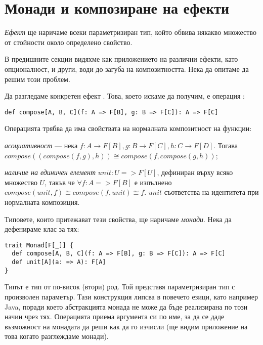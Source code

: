\section{Монади и композиране на ефекти}
\label{sec:monads}

\emph{Ефект} ще наричаме всеки параметризиран тип, който обвива някакво множество от стойности около определено свойство.

В предишните секции видяхме как приложението на различни ефекти, като опционалност,  и други, води до загуба на композитността. Нека да опитаме да решим този проблем.

Да разгледаме конкретен ефект . Това, което искаме да получим, е операция :

\begin{lstlisting}
def compose[A, B, C](f: A => F[B], g: B => F[C]): A => F[C]
\end{lstlisting}

Операцията трябва да има свойствата на нормалната композитност на функции:

\begin{itemize*}
  \item \emph{асоциативност} — нека $f: A \rightarrow F[B], g: B \rightarrow F[C], h: C \rightarrow F[D]$. Тогава $compose((compose(f, g), h)) \cong compose(f, compose(g, h))$;
  \item \emph{наличие на единичен елемент} $unit: U => F[U]$, дефиниран върху всяко множество $U$, такъв че $\forall f: A => F[B]$ е изпълнено $compose(unit, f) \cong compose(f, unit) \cong f$. $unit$ съответства на идентитета при нормалната композиция.
\end{itemize*}

Типовете, които притежават тези свойства, ще наричаме \emph{монади}. Нека да дефенираме клас за тях:

\begin{lstlisting}
trait Monad[F[_]] {
  def compose[A, B, C](f: A => F[B], g: B => F[C]): A => F[C]
  def unit[A](a: => A): F[A]
}
\end{lstlisting}

Типът  е тип от по-висок (втори) род. Той представя параметризиран тип с произволен параметър. Тази конструкция липсва в повечето езици, като например Java, поради което абстракцията монада не може да бъде реализирана по този начин чрез тях. Операцията  приема аргумента си по име, за да се даде възможност на монадата да реши как да го изчисли (ще видим приложение на това когато разглеждаме  монади).


